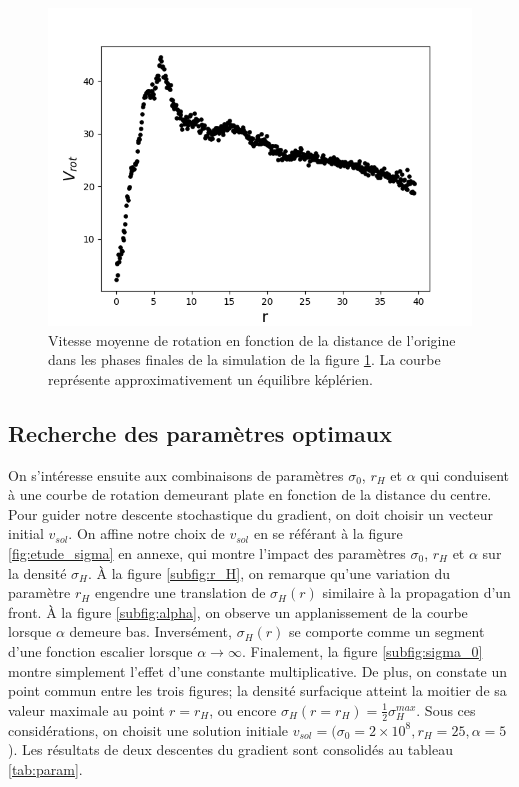 \documentclass{article}
\begin{document}
\begin{figure}[H]
	\centering
	\includegraphics[scale=0.7]{images/VROTkepler.png}
	\caption{Vitesse moyenne de rotation en fonction de la distance de l'origine dans les phases finales de la simulation de la figure \ref{fig:courbe_rot_without}. La courbe représente approximativement un équilibre képlérien.}
	\label{fig:courbe_rot_without}
\end{figure}

\subsection{Recherche des paramètres optimaux}\label{subsec:parametres}

On s'intéresse ensuite aux combinaisons de paramètres $\sigma_0$, $r_H$ et $\alpha$ qui conduisent à une courbe de rotation demeurant plate en fonction de la distance du centre. Pour guider notre descente stochastique du gradient, on doit choisir un vecteur initial $v_{sol}$. On affine notre choix de $v_{sol}$ en se référant à la figure \ref{fig:etude_sigma} en annexe, qui montre l'impact des paramètres $\sigma_0$, $r_H$ et $\alpha$ sur la densité $\sigma_H$. À la figure \ref{subfig:r_H}, on remarque qu'une variation du paramètre $r_H$ engendre une translation de $\sigma_H(r)$ similaire à la propagation d'un front. À la figure \ref{subfig:alpha}, on observe un applanissement de la courbe lorsque $\alpha$ demeure bas. Inversément, $\sigma_H(r)$ se comporte comme un segment d'une fonction escalier lorsque $\alpha \rightarrow \infty$. Finalement, la figure \ref{subfig:sigma_0} montre simplement l'effet d'une constante multiplicative. De plus, on constate un point commun entre les trois figures; la densité surfacique atteint la moitier de sa valeur maximale au point $r=r_H$, ou encore $\sigma_H(r=r_H)=\frac{1}{2}\sigma_H^{max}$. Sous ces considérations, on choisit une solution initiale $v_{sol}=(\sigma_0=2\times 10^8, r_H=25, \alpha=5$). Les résultats de deux descentes du gradient sont consolidés au tableau \ref{tab:param}.
\end{document}
